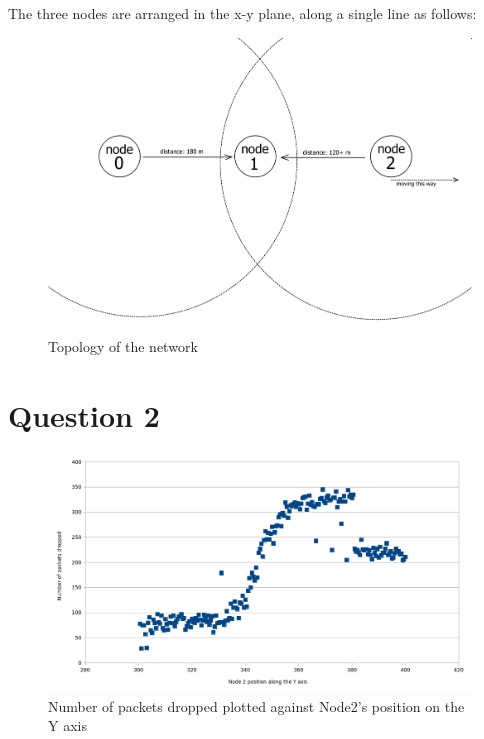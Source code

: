 \documentclass[11pt,journal]{article}
\begin{document}
	\section{}
	The three nodes are arranged in the x-y plane, along a single line as follows:
	\begin{figure}[h]
		\centering
		\includegraphics[scale=0.6]{lab3topology2.png}
		\caption{Topology of the network}
	\end{figure}

	\section{Question 2}
	
	\begin{figure}[h]
		\centering
		\includegraphics[scale=0.6]{graph1.png}
		\caption{Number of packets dropped plotted against Node2's position on the Y axis}
	\end{figure}
	
\end{document}
